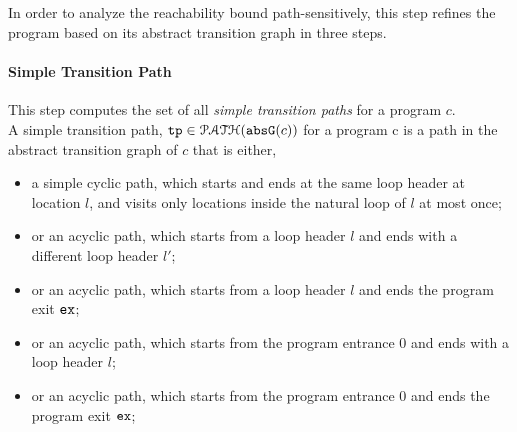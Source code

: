 \subsection{}
\label{sec:pathsensitive_rb-refine}
In order to analyze the reachability bound path-sensitively, this step refines the program based on its abstract transition graph in three steps.
%
\paragraph{Simple Transition Path} This step computes the set of all \emph{simple transition paths} for a program $c$.
\\
%
A simple transition path, $\mathtt{tp} \in \mathcal{PATH}(\mathtt{abs}{\mathtt{G}}(c))$ for a program c is
a path in the abstract transition graph of $c$ that is either,
\begin{itemize}
  \item a simple cyclic path, which starts and ends at the same loop header at location $l$, 
  and visits only locations inside the natural loop of $l$ at most once;
  \item or an acyclic path, which starts from a loop header $l$ 
and ends with a different loop header $l'$;
\item or an acyclic path, which starts from a loop header $l$ 
and ends the program exit $\mathtt{ex}$;
\item or an acyclic path, which starts from the program entrance $0$
and ends with a loop header $l$;
\item or an acyclic path, which starts from the program entrance $0$
and ends the program exit $\mathtt{ex}$;
\end{itemize}
